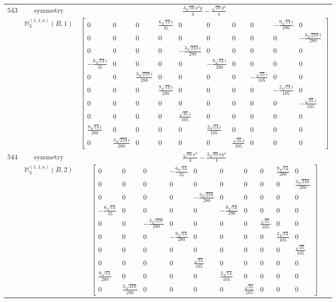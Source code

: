 \documentclass[fleqn,8pt,landscape]{jsarticle}
\begin{document}
\begin{longtable}{ccc}
$ 543 $ & $ \text{symmetry} $ & $ \frac{3 \sqrt{10} x^{2} y}{4} - \frac{\sqrt{10} y^{3}}{4} $ \\
$  $ & $ \mathbb{M}_{3}^{(1,1;a)}(B,1) $ & $ \begin{bmatrix} 0 & 0 & 0 & \frac{6 \sqrt{14} i}{35} & 0 & 0 & 0 & 0 & - \frac{9 \sqrt{14} i}{280} & 0 \\ 0 & 0 & 0 & 0 & 0 & 0 & 0 & 0 & 0 & - \frac{3 \sqrt{210} i}{280} \\ 0 & 0 & 0 & 0 & - \frac{3 \sqrt{210} i}{280} & 0 & 0 & 0 & 0 & 0 \\ - \frac{6 \sqrt{14} i}{35} & 0 & 0 & 0 & 0 & - \frac{9 \sqrt{14} i}{280} & 0 & 0 & 0 & 0 \\ 0 & 0 & \frac{3 \sqrt{210} i}{280} & 0 & 0 & 0 & 0 & - \frac{\sqrt{35} i}{105} & 0 & 0 \\ 0 & 0 & 0 & \frac{9 \sqrt{14} i}{280} & 0 & 0 & 0 & 0 & - \frac{2 \sqrt{14} i}{105} & 0 \\ 0 & 0 & 0 & 0 & 0 & 0 & 0 & 0 & 0 & - \frac{\sqrt{35} i}{105} \\ 0 & 0 & 0 & 0 & \frac{\sqrt{35} i}{105} & 0 & 0 & 0 & 0 & 0 \\ \frac{9 \sqrt{14} i}{280} & 0 & 0 & 0 & 0 & \frac{2 \sqrt{14} i}{105} & 0 & 0 & 0 & 0 \\ 0 & \frac{3 \sqrt{210} i}{280} & 0 & 0 & 0 & 0 & \frac{\sqrt{35} i}{105} & 0 & 0 & 0 \end{bmatrix} $ \\ \hline
$ 544 $ & $ \text{symmetry} $ & $ \frac{\sqrt{10} x^{3}}{4} - \frac{3 \sqrt{10} x y^{2}}{4} $ \\
$  $ & $ \mathbb{M}_{3}^{(1,1;a)}(B,2) $ & $ \begin{bmatrix} 0 & 0 & 0 & - \frac{6 \sqrt{14}}{35} & 0 & 0 & 0 & 0 & \frac{9 \sqrt{14}}{280} & 0 \\ 0 & 0 & 0 & 0 & 0 & 0 & 0 & 0 & 0 & \frac{3 \sqrt{210}}{280} \\ 0 & 0 & 0 & 0 & - \frac{3 \sqrt{210}}{280} & 0 & 0 & 0 & 0 & 0 \\ - \frac{6 \sqrt{14}}{35} & 0 & 0 & 0 & 0 & - \frac{9 \sqrt{14}}{280} & 0 & 0 & 0 & 0 \\ 0 & 0 & - \frac{3 \sqrt{210}}{280} & 0 & 0 & 0 & 0 & \frac{\sqrt{35}}{105} & 0 & 0 \\ 0 & 0 & 0 & - \frac{9 \sqrt{14}}{280} & 0 & 0 & 0 & 0 & \frac{2 \sqrt{14}}{105} & 0 \\ 0 & 0 & 0 & 0 & 0 & 0 & 0 & 0 & 0 & \frac{\sqrt{35}}{105} \\ 0 & 0 & 0 & 0 & \frac{\sqrt{35}}{105} & 0 & 0 & 0 & 0 & 0 \\ \frac{9 \sqrt{14}}{280} & 0 & 0 & 0 & 0 & \frac{2 \sqrt{14}}{105} & 0 & 0 & 0 & 0 \\ 0 & \frac{3 \sqrt{210}}{280} & 0 & 0 & 0 & 0 & \frac{\sqrt{35}}{105} & 0 & 0 & 0 \end{bmatrix} $ \\ \hline

\end{longtable}
\end{document}
